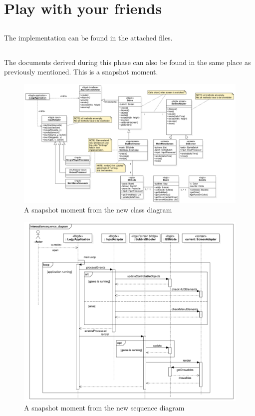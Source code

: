 \documentclass[a4paper,11pt]{article}
\begin{document}
\section{Play with your friends}

\subsection{}
The implementation can be found in the attached files.
\subsection{}
The documents derived during this phase can also be found in the same place as previously mentioned. This is a snapshot moment.\\
\begin{figure}[h]
\includegraphics[width=\textwidth]{new_class_diagram}
\caption{A snapshot moment from the new class diagram}
\end{figure}
\begin{figure}[h]
\includegraphics[width=\textwidth]{new_sequence_diagram}
\caption{A snapshot moment from the new sequence diagram}
\end{figure}
\end{document}
